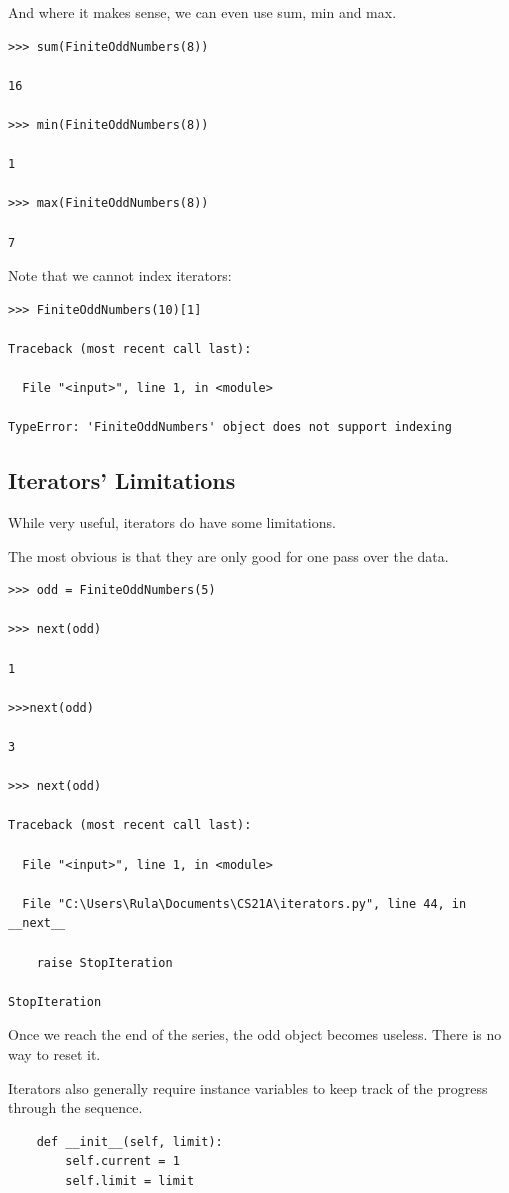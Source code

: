 \documentclass{article}
\begin{document}
And where it makes sense, we can even use sum, min and max.

\begin{lstlisting}
>>> sum(FiniteOddNumbers(8))

16

>>> min(FiniteOddNumbers(8))

1

>>> max(FiniteOddNumbers(8))

7
\end{lstlisting}

Note that we cannot index iterators:

\begin{lstlisting}
>>> FiniteOddNumbers(10)[1]

Traceback (most recent call last):

  File "<input>", line 1, in <module>

TypeError: 'FiniteOddNumbers' object does not support indexing
\end{lstlisting}

\subsection{Iterators' Limitations}
While very useful, iterators do have some limitations. 

The most obvious is that they are only good for one pass over the data.

\begin{lstlisting}
>>> odd = FiniteOddNumbers(5)

>>> next(odd)

1

>>>next(odd)

3

>>> next(odd)

Traceback (most recent call last):

  File "<input>", line 1, in <module>

  File "C:\Users\Rula\Documents\CS21A\iterators.py", line 44, in __next__

    raise StopIteration

StopIteration
\end{lstlisting}

Once we reach the end of the series, the odd object becomes useless.  There is no way to reset it.

Iterators also generally require instance variables to keep track of the  progress through the sequence.

\begin{lstlisting}
    def __init__(self, limit):
        self.current = 1
        self.limit = limit
\end{lstlisting}
\end{document}
